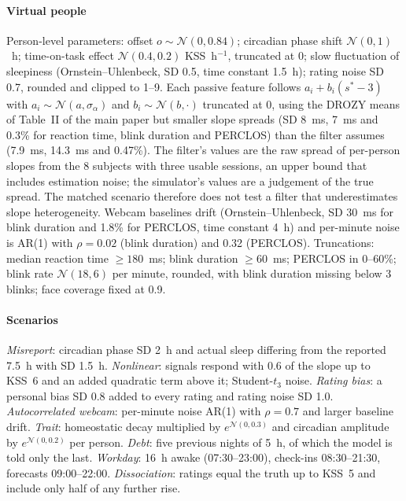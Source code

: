 \documentclass[journal]{IEEEtran}
\begin{document}
\paragraph*{Virtual people} Person-level parameters: offset $o \sim \mathcal{N}(0, 0.84)$; circadian phase shift $\mathcal{N}(0, 1)$~h; time-on-task effect $\mathcal{N}(0.4, 0.2)$ KSS~h$^{-1}$, truncated at 0; slow fluctuation of sleepiness (Ornstein--Uhlenbeck, SD 0.5, time constant 1.5~h); rating noise SD 0.7, rounded and clipped to 1--9. Each passive feature follows $a_i + b_i (s^* - 3)$ with $a_i \sim \mathcal{N}(a, \sigma_\alpha)$ and $b_i \sim \mathcal{N}(b, \cdot)$ truncated at 0, using the DROZY means of Table~II of the main paper but smaller slope spreads (SD 8~ms, 7~ms and 0.3\% for reaction time, blink duration and PERCLOS) than the filter assumes (7.9~ms, 14.3~ms and 0.47\%). The filter's values are the raw spread of per-person slopes from the 8 subjects with three usable sessions, an upper bound that includes estimation noise; the simulator's values are a judgement of the true spread. The matched scenario therefore does not test a filter that underestimates slope heterogeneity. Webcam baselines drift (Ornstein--Uhlenbeck, SD 30~ms for blink duration and 1.8\% for PERCLOS, time constant 4~h) and per-minute noise is AR(1) with $\rho = 0.02$ (blink duration) and 0.32 (PERCLOS). Truncations: median reaction time $\geq 180$~ms; blink duration $\geq 60$~ms; PERCLOS in 0--60\%; blink rate $\mathcal{N}(18, 6)$ per minute, rounded, with blink duration missing below 3 blinks; face coverage fixed at 0.9.

\paragraph*{Scenarios} \emph{Misreport}: circadian phase SD 2~h and actual sleep differing from the reported 7.5~h with SD 1.5~h. \emph{Nonlinear}: signals respond with 0.6 of the slope up to KSS~6 and an added quadratic term above it; Student-$t_3$ noise. \emph{Rating bias}: a personal bias SD 0.8 added to every rating and rating noise SD 1.0. \emph{Autocorrelated webcam}: per-minute noise AR(1) with $\rho = 0.7$ and larger baseline drift. \emph{Trait}: homeostatic decay multiplied by $e^{\mathcal{N}(0, 0.3)}$ and circadian amplitude by $e^{\mathcal{N}(0, 0.2)}$ per person. \emph{Debt}: five previous nights of 5~h, of which the model is told only the last. \emph{Workday}: 16~h awake (07:30--23:00), check-ins 08:30--21:30, forecasts 09:00--22:00. \emph{Dissociation}: ratings equal the truth up to KSS~5 and include only half of any further rise.
\end{document}

